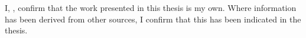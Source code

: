 I, {\theauthor}, confirm that the work presented in this thesis is my own. Where information has been derived from other sources, I confirm that this has been indicated in the thesis.